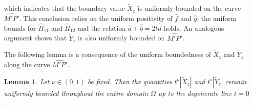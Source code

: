 \documentclass[3p,11pt]{elsarticle}
\numberwithin{equation}{section}
\newtheorem{lemma}{Lemma}[section]
\begin{document}
which indicates that the boundary value $\widetilde X_{z}$ is uniformly bounded on the curve $\widehat{M'P'}$. This conclusion relies on the uniform positivity of $\hat f$ and $\hat g$, the uniform bounds for $\hat{H}_{11}$ and $\hat{H}_{12}$ and the relation $\widehat{a}+\hat{b}=2t\hat{d}$ holds. An analogous argument shows that $\widetilde Y_{z}$ is also uniformly bounded on $\widehat{M'P'}$.

The following lemma is a consequence of the uniform boundedness of $\widetilde X_{z}$ and $\widetilde Y_{z}$ along the curve $\widehat{M'P'}$.
\begin{lemma}\label{Sol_3_l3}
    Let $\nu\in(0,1)$ be fixed. Then the quantities $t^{\nu}|\widetilde  {X}_{z}|$ and $t^{\nu}| \widetilde Y_{z}|$ remain uniformly bounded throughout the entire domain $\Omega$ up to the degenerate line $t=0$.
\end{lemma}
\end{document}
